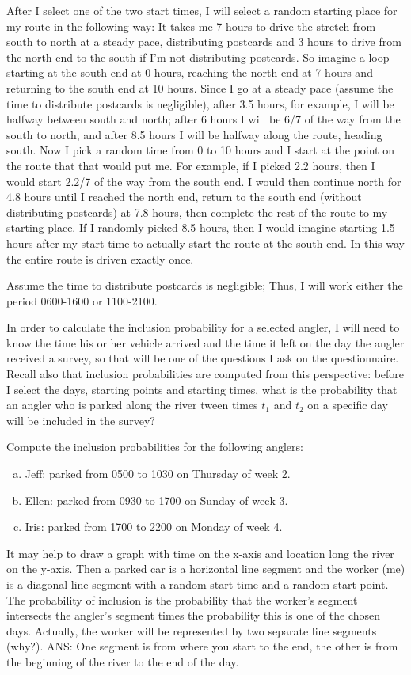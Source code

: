 \documentclass{homework}
\begin{document}
\begin{longproblem}
  After I select one of the two start times, I will select a random starting place for my route in the following way: It takes me 7 hours to drive the stretch from south to north at a steady pace, distributing postcards and 3 hours to drive from the north end to the south if I'm not distributing postcards.  So imagine a loop starting at the south end at 0 hours, reaching the north end at 7 hours and returning to the south end at 10 hours.  Since I go at a steady pace (assume the time to distribute postcards is negligible), after 3.5 hours, for example, I will be halfway between south and north; after 6 hours I will be 6/7 of the way from the south to north, and after 8.5 hours I will be halfway along the route, heading south.  Now I pick a random time from 0 to 10 hours and I start at the point on the route that that would put me.  For example, if I picked 2.2 hours, then I would start 2.2/7 of the way from the south end. I would then continue north for 4.8 hours until I reached the north end, return to the south end (without distributing postcards) at 7.8 hours, then complete the rest of the route to my starting place.  If I randomly picked 8.5 hours, then I would imagine starting 1.5 hours after my start time to actually start the route at the south end.  In this way the entire route is driven exactly once.
  
  Assume the time to distribute postcards is negligible; Thus, I will work either the period 0600-1600 or 1100-2100.
  
  In order to calculate the inclusion probability for a selected angler, I will need to know the time his or her vehicle arrived and the time it left on the day the angler received a survey, so that will be one of the questions I ask on the questionnaire.  Recall also that inclusion probabilities are computed from this perspective: before I select the days, starting points and starting times, what is the probability that an angler who is parked along the river tween times $t_1$ and $t_2$ on a specific day will be included in the survey?
  
  Compute the inclusion probabilities for the following anglers:
  \begin{enumerate}[(a)]
    \item Jeff: parked from 0500 to 1030 on Thursday of week 2.
    \item Ellen: parked from 0930 to 1700 on Sunday of week 3.
    \item Iris: parked from 1700 to 2200 on Monday of week 4.
  \end{enumerate} 

  It may help to draw a graph with time on the x-axis and location long the river on the y-axis.  Then a parked car is a horizontal line segment and the worker (me) is a diagonal line segment with a random start time and a random start point.  The probability of inclusion is the probability that the worker's segment intersects the angler's segment times the probability this is one of the chosen days.  Actually, the worker will be represented by two separate line segments (why?). ANS: One segment is from where you start to the end, the other is from the beginning of the river to the end of the day.
\end{longproblem}
\end{document}
